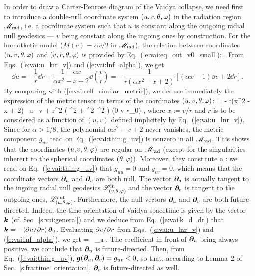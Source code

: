 In order to draw a Carter-Penrose diagram of the Vaidya collapse,
we need first to introduce a double-null coordinate system $(u, v, \theta,\varphi)$
in the radiation region $\mathscr{M}_{\rm rad}$, i.e. a coordinate system such that
$u$ is constant along the outgoing radial null geodesics ---
$v$ being constant along the ingoing ones by construction.
For the homothetic model ($M(v) = \alpha v /2$ in $\mathscr{M}_{\rm rad}$),
the relation between coordinates $(u, v, \theta,\varphi)$ and
$(v, r, \theta, \varphi)$ is provided by Eq.~(\ref{e:vai:eq_out_v0_small}):
\be \label{e:vai:u_lnr_v}
    .
\ee
From Eqs.~(\ref{e:vai:u_lnr_v}) and (\ref{e:vai:lnf_alpha}), we get
\[
   \dd u = - \frac{1}{r} \dd r  +  \frac{1 - \alpha x}{\alpha x^2 - x + 2} \dd\left(\frac{v}{r}\right)
    = - \frac{1}{r(\alpha x^2 - x + 2)} \left[ (\alpha x - 1) \dd v + 2 \dd r \right] .
\]
By comparing with (\ref{e:vai:self_similar_metric}), we deduce immediately
the expression of the metric tensor in terms of the coordinates $(u,v,\theta,\varphi)$:
\be \label{e:vai:thin:g_uv}
     =  - r(\alpha x^2 - x + 2) \, \dd u \, \dd v
    + r^2 \left( \dd\th^2 + \sin^2\th\, \dd\ph^2 \right) \qquad
        (0 \leq v \leq v_0) ,
\ee
where $x := v/r$  and $r$ is to be considered as a function of $(u,v)$ defined implicitely
by Eq.~(\ref{e:vai:u_lnr_v}).
Since for $\alpha > 1/8$, the polynomial $\alpha x^2 - x + 2$ never vanishes,
the metric component $g_{uv}$ read on Eq.~(\ref{e:vai:thin:g_uv}) is
nonzero in all $\mathscr{M}_{\rm rad}$. This shows that
the coordinates $(u,v,\theta,\varphi)$ are regular on $\mathscr{M}_{\rm rad}$
(except for the singularities inherent to the spherical coordinates $(\theta,\varphi)$).
Moreover, they constitute a :
we read on Eq.~(\ref{e:vai:thin:g_uv}) that
$g_{uu} = 0$ and $g_{vv} = 0$, which means that the coordinate vectors $\bm{\partial}_u$
and $\bm{\partial}_v$ are both null. The vector $\bm{\partial}_u$ is actually tangent to the
ingoing radial null geodesics $\mathscr{L}^{\rm in}_{(v,\theta,\varphi)}$
and the vector $\bm{\partial}_v$ is tangent to the outgoing ones, $\mathscr{L}^{\rm out}_{(u,\theta,\varphi)}$.
Furthermore, the null vectors $\bm{\partial}_u$
and $\bm{\partial}_v$ are both future-directed. Indeed,
the time orientation of Vaidya spacetime is given by the vector $\bm{k}$
(cf. Sec.~\ref{s:vai:general}) and we deduce from Eq.~(\ref{e:vai:k_d_dr})
that $\bm{k} = - ({\partial u}/{\partial r}) \, \bm{\partial}_u$. Evaluating ${\partial u}/{\partial r}$
from Eqs.~(\ref{e:vai:u_lnr_v}) and (\ref{e:vai:lnf_alpha}), we get
\be
     = \, \wpar_u .
\ee
The coefficient in front of $\bm{\partial}_u$ being always positive, we conclude that
$\bm{\partial}_u$ is future-directed. Then, from Eq.~(\ref{e:vai:thin:g_uv}),
$\bm{g}(\bm{\partial}_u,\bm{\partial}_v) = g_{uv} < 0$, so that, according to Lemma~2 of
Sec.~\ref{s:fra:time_orientation}, $\bm{\partial}_v$ is future-directed as well.

